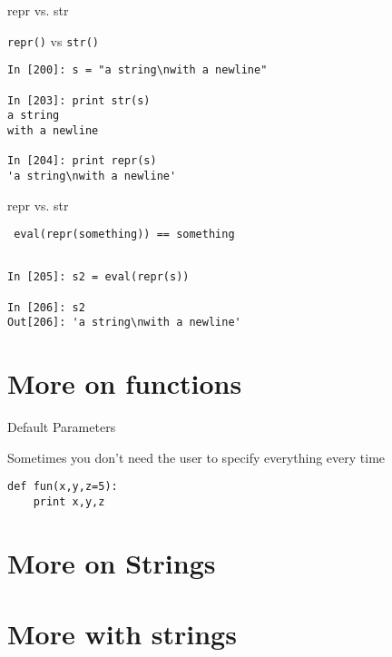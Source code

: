 \documentclass{beamer}
\begin{document}
\begin{frame}[fragile]{repr vs. str}

{\Large \verb|repr()| vs \verb|str()| }

\begin{verbatim}
In [200]: s = "a string\nwith a newline"

In [203]: print str(s)
a string
with a newline

In [204]: print repr(s)
'a string\nwith a newline'

\end{verbatim}

\end{frame}

\begin{frame}[fragile]{repr vs. str}


{\Large \verb| eval(repr(something)) == something | }

\begin{verbatim}

In [205]: s2 = eval(repr(s))

In [206]: s2
Out[206]: 'a string\nwith a newline'
\end{verbatim}

\end{frame}


\section{More on functions}

\begin{frame}[fragile]{Default Parameters}

 {\Large Sometimes you don't need the user to specify everything every time}

\begin{verbatim}
def fun(x,y,z=5):
    print x,y,z
\end{verbatim}

\end{frame} 


\section{More on Strings}

\section{More with strings}
\end{document}
